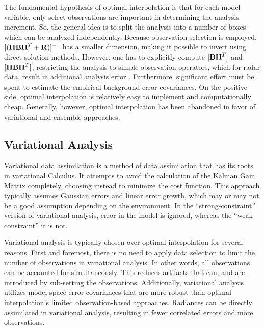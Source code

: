 The fundamental hypothesis of optimal interpolation is that for each model variable, only select observations are important in determining the analysis increment. So, the general idea is to split the analysis into a number of boxes which can be analyzed independently. Because observation selection is employed, $[(\mathbf{HBH}^T + \mathbf{R})]^{-1}$ has a smaller dimension, making it possible to invert using direct solution methods. However, one has to explicitly compute $[\mathbf{BH}^T]$ and $[\mathbf{HBH}^T]$, restricting the analysis to simple observation operators, which for radar data, result in additional analysis error \citep{fabry2011details}. Furthermore, significant effort must be spent to estimate the empirical background error covariances. On the positive side, optimal interpolation is relatively easy to implement and computationally cheap.  Generally, however, optimal interpolation has been abandoned in favor of variational and ensemble approaches.




\subsection{Variational Analysis}

Variational data assimilation is a method of data assimilation that has its roots in variational Calculus. It attempts to avoid the calculation of the Kalman Gain Matrix completely, choosing instead to minimize the cost function. This approach typically assumes Gaussian errors and linear error growth, which may or may not be a good assumption depending on the environment. In the ``strong-constraint'' version of variational analysis, error in the model is ignored, whereas the ``weak-constraint'' it is not.


Variational analysis is typically chosen over optimal interpolation for several reasons. First and foremost, there is no need to apply data selection to limit the number of observations in variational analysis. In other words, all observations can be accounted for simultaneously. This reduces artifacts that can, and are, introduced by sub-setting the observations. Additionally, variational analysis utilizes model-space error covariances that are more robust than optimal interpolation's limited observation-based approaches. Radiances can be directly assimilated in variational analysis, resulting in fewer correlated errors and more observations.




